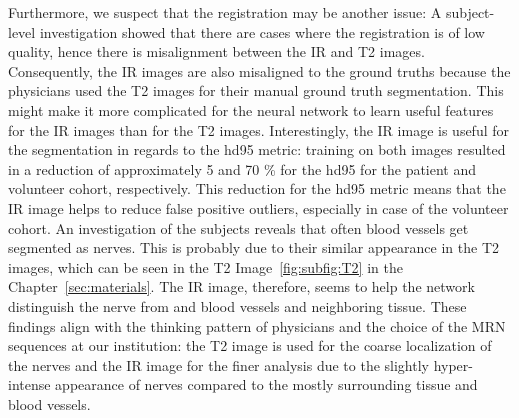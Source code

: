 Furthermore, we suspect that the registration may be another issue: A subject-level investigation showed that there are cases where the registration is of low quality, hence there is misalignment between the IR and T2 images. Consequently, the IR images are also misaligned to the ground truths because the physicians used the T2 images for their manual ground truth segmentation. This might make it more complicated for the neural network to learn useful features for the IR images than for the T2 images. Interestingly, the IR image is useful for the segmentation in regards to the \gls{hd95} metric: training on both images resulted in a reduction of approximately 5 and 70 \% for the \acrlong{hd95} for the patient and volunteer cohort, respectively. This reduction for the \gls{hd95} metric means that the IR image helps to reduce false positive outliers, especially in case of the volunteer cohort. An investigation of the subjects reveals that often blood vessels get segmented as nerves. This is probably due to their similar appearance in the T2 images, which can be seen in the T2 Image~\ref{fig:subfig:T2} in the Chapter~\ref{sec:materials}. The IR image, therefore, seems to help the network distinguish the nerve from and blood vessels and neighboring tissue. These findings align with the thinking pattern of physicians and the choice of the MRN sequences at our institution: the T2 image is used for the coarse localization of the nerves and the IR image for the finer analysis due to the slightly hyper-intense appearance of nerves compared to the mostly surrounding tissue and blood vessels.

